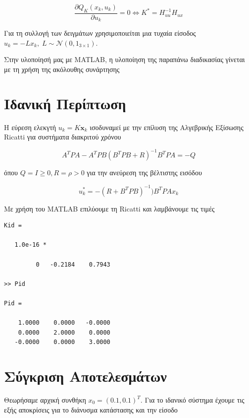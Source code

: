 \documentclass[a4paper,oneside,12pt]{article}
\renewcommand{\vec}[1]{\ensuremath{\mathbf {  #1 }}}
\begin{document}
$$\frac{\partial Q_K(x_k, u_k)} {\partial u_k} = 0 \iff K^* = H_{uu}^{-1} H_{ux}$$

Για τη συλλογή των δειγμάτων χρησιμοποιείται μια τυχαία είσοδος $u_k = - L x_k, \; L \sim \mathcal N(0, 1_{3 \times 1})$.

Στην υλοποίησή μας με MATLAB, η υλοποίηση της παραπάνω διαδικασίας γίνεται με τη χρήση της ακόλουθης συνάρτησης




\section{Ιδανική Περίπτωση} 

Η εύρεση ελεκγτή $u_k = K \vec x_k$ ισοδυναμεί με την επίλυση της Αλγεβρικής Εξίσωσης Ricatti για συστήματα διακριτού χρόνου

$$A^T P A - A^T P B (B^T P B + R)^{-1} B^T P A = -Q$$

όπου $Q = I \ge 0, R = \rho > 0$ για την ανεύρεση της βέλτιστης εισόδου 

$$u^*_k = - (R + B^TPB)^{-1})B^T P A x_k$$

Με χρήση του MATLAB επιλύουμε τη Ricatti και λαμβάνουμε τις τιμές

\begin{lstlisting}
Kid =

   1.0e-16 *

         0   -0.2184    0.7943

>> Pid

Pid =

    1.0000    0.0000   -0.0000
    0.0000    2.0000    0.0000
   -0.0000    0.0000    3.0000

\end{lstlisting}

\newpage
\section{Σύγκριση Αποτελεσμάτων}

Θεωρήσαμε αρχική συνθήκη $x_0 = (0.1, 0.1)^T$. Για το ιδανικό σύστημα έχουμε τις εξής αποκρίσεις για το διάνυσμα κατάστασης και την είσοδο
\end{document}
